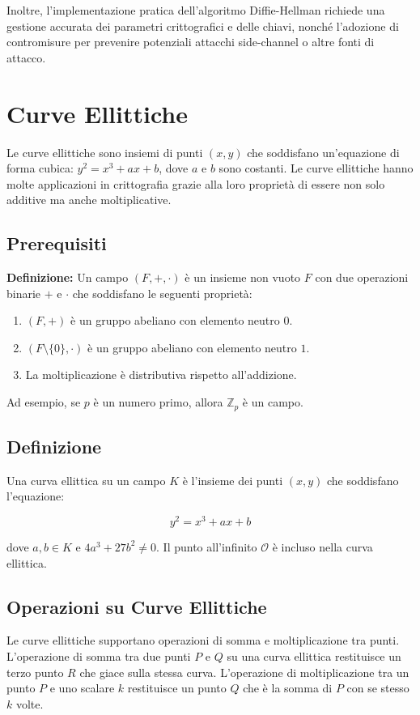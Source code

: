 \documentclass[a4paper,12pt]{report}
\begin{document}
Inoltre, l'implementazione pratica dell'algoritmo Diffie-Hellman richiede una gestione accurata dei parametri crittografici e delle chiavi, nonché l'adozione di contromisure per prevenire potenziali attacchi side-channel o altre fonti di attacco.
%
%
%
%
%
%
\chapter{Curve Ellittiche}
Le curve ellittiche sono insiemi di punti $(x, y)$ che soddisfano un'equazione di forma cubica: $y^2 = x^3 + ax + b$, dove $a$ e $b$ sono costanti. Le curve ellittiche hanno molte applicazioni in crittografia grazie alla loro proprietà di essere non solo additive ma anche moltiplicative.

\section{Prerequisiti}
\textbf{Definizione:} Un campo \( (F, +, \cdot) \) è un insieme non vuoto \( F \) con due operazioni binarie \( + \) e \( \cdot \) che soddisfano le seguenti proprietà:
\begin{enumerate}
    \item \( (F, +) \) è un gruppo abeliano con elemento neutro \( 0 \).
    \item \( (F \setminus \{0\}, \cdot) \) è un gruppo abeliano con elemento neutro \( 1 \).
    \item La moltiplicazione è distributiva rispetto all'addizione.
\end{enumerate}

Ad esempio, se \( p \) è un numero primo, allora \( \mathbb{Z}_p\) è un campo.

\section{Definizione}

Una curva ellittica su un campo $K$ è l'insieme dei punti $(x, y)$ che soddisfano l'equazione:

\[y^2 = x^3 + ax + b\]

dove $a, b \in K$ e $4a^3 + 27b^2 \neq 0$. Il punto all'infinito $\mathcal{O}$ è incluso nella curva ellittica.

\section{Operazioni su Curve Ellittiche}

Le curve ellittiche supportano operazioni di somma e moltiplicazione tra punti. L'operazione di somma tra due punti $P$ e $Q$ su una curva ellittica restituisce un terzo punto $R$ che giace sulla stessa curva. L'operazione di moltiplicazione tra un punto $P$ e uno scalare $k$ restituisce un punto $Q$ che è la somma di $P$ con se stesso $k$ volte.
\end{document}
